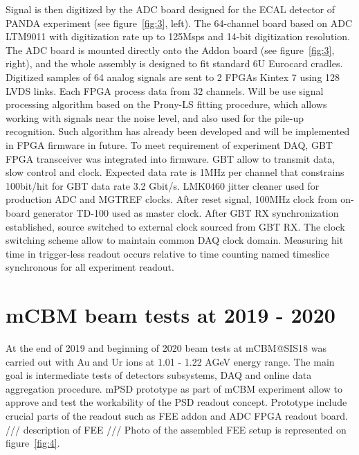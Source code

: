 \documentclass[a4paper,11pt]{article}
\begin{document}
Signal is then digitized by the ADC board designed for the ECAL detector of PANDA experiment \cite{4} (see figure~\ref{fig:3}, left). The 64-channel board based on ADC LTM9011 with digitization rate up to 125Msps and 14-bit digitization resolution. The ADC board is mounted directly onto the Addon board (see figure~\ref{fig:3}, right), and the whole assembly is designed to fit standard 6U Eurocard cradles.
Digitized samples of 64 analog signals are sent to 2 FPGAs Kintex 7 using 128 LVDS links. Each FPGA process data from 32 channels. Will be use signal processing algorithm based on the Prony-LS fitting procedure, which allows working with signals near the noise level, and also used for the pile-up recognition. Such algorithm has already been developed and will be implemented in FPGA firmware in future.
To meet requirement of experiment DAQ, GBT FPGA transceiver was integrated into firmware. GBT allow to transmit data, slow control and clock. Expected data rate is 1MHz per channel that constrains 100bit/hit for GBT data rate 3.2 Gbit/s. 
LMK0460 jitter cleaner used for production ADC and MGTREF clocks. After reset signal, 100MHz clock from on-board generator TD-100 used as master clock. After GBT RX synchronization established, source switched to external clock sourced from GBT RX. The clock switching scheme allow to maintain common DAQ clock domain. Measuring hit time in trigger-less readout occurs relative to time counting named timeslice synchronous for all experiment readout.

\section{mCBM beam tests at 2019 - 2020}
At the end of 2019 and beginning of 2020 beam tests at mCBM@SIS18 was carried out with Au and Ur ions at 1.01 - 1.22 AGeV energy range. The main goal is intermediate tests of detectors subsystems, DAQ and online data aggregation procedure. mPSD prototype as part of mCBM experiment allow to approve and test the workability of the PSD readout concept. Prototype include crucial parts of the readout such as FEE addon and ADC FPGA readout board.
/// description of FEE ///
Photo of the assembled FEE setup is represented on figure~\ref{fig:4}.
\end{document}
